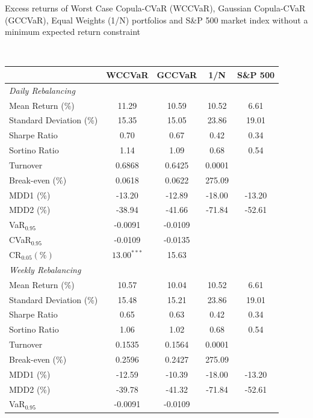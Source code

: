 \documentclass[a4paper,10pt]{article}
\begin{document}
\begin{threeparttable}[H]
	\caption{Excess returns of Worst Case Copula-CVaR (WCCVaR), Gaussian Copula-CVaR (GCCVaR), Equal Weights (1/N) portfolios and S\&P 500 market index without a minimum expected return constraint}
	\label{tab:tabletwo}\centering
	\tiny \
	\begin{tabularx}{\textwidth}{@{\extracolsep{\fill}}lcccc@{}}
		\toprule & \textbf{WCCVaR} & \textbf{GCCVaR} & \textbf{1/N} & \textbf{S\&P 500%
		} \\
		\midrule[\heavyrulewidth] \textit{Daily Rebalancing} &  &  &  &  \\
		\midrule[\heavyrulewidth] Mean Return (\%) &  11.29 & 10.59 & 10.52 & 6.61
		\\
		Standard Deviation (\%) & 15.35 &  15.05 & 23.86 & 19.01 \\
		Sharpe Ratio &  0.70 & 0.67 & 0.42 & 0.34 \\
		Sortino Ratio & 1.14 & 1.09 & 0.68 & 0.54 \\
		Turnover & 0.6868 & 0.6425 & 0.0001 &  \\
		Break-even (\%) & 0.0618 & 0.0622 & 275.09 &  \\
		MDD1 (\%) & -13.20 &  -12.89 & -18.00 & -13.20 \\
		MDD2 (\%) &  -38.94 & -41.66 & -71.84 & -52.61 \\
		VaR$_{0.95}$ &  -0.0091 & -0.0109 &  &  \\
		CVaR$_{0.95}$ &  -0.0109 & -0.0135 &  &  \\
		CR$_{0.05} (\%)$ &  $13.00^{***}$ & 15.63 &  &  \\
		\midrule[\heavyrulewidth] \textit{Weekly Rebalancing} &  &  &  &  \\
		\midrule[\heavyrulewidth] Mean Return (\%) & 10.57 & 10.04 & 10.52 & 6.61
		\\
		Standard Deviation (\%) & 15.48 & 15.21 & 23.86 & 19.01 \\
		Sharpe Ratio & 0.65 & 0.63 & 0.42 & 0.34 \\
		Sortino Ratio & 1.06 & 1.02 & 0.68 & 0.54 \\
		Turnover & 0.1535 & 0.1564 & 0.0001 &  \\
		Break-even (\%) &  0.2596 & 0.2427 & 275.09 &  \\
		MDD1 (\%) & -12.59 & -10.39 & -18.00 & -13.20 \\
		MDD2 (\%) & -39.78 & -41.32 & -71.84 & -52.61 \\
		VaR$_{0.95}$ &  -0.0091 & -0.0109 &  &  \\

\end{tabularx}
\end{threeparttable}
\end{document}
